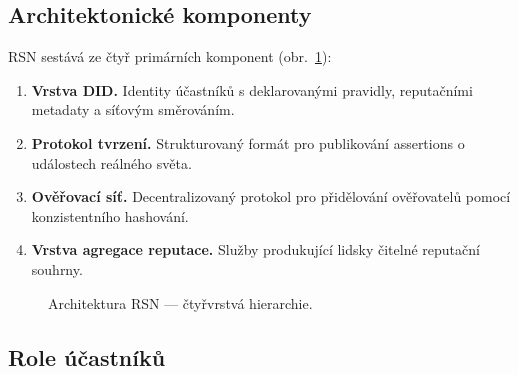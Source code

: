\documentclass[11pt,a4paper,twocolumn]{article}
\begin{document}
\subsection{Architektonické komponenty}

RSN sestává ze čtyř primárních komponent (obr.~\ref{fig:architecture}):
\begin{enumerate}[nosep]
\item \textbf{Vrstva DID.} Identity účastníků s deklarovanými pravidly, reputačními metadaty a síťovým směrováním.
\item \textbf{Protokol tvrzení.} Strukturovaný formát pro publikování assertions o událostech reálného světa.
\item \textbf{Ověřovací síť.} Decentralizovaný protokol pro přidělování ověřovatelů pomocí konzistentního hashování.
\item \textbf{Vrstva agregace reputace.} Služby produkující lidsky čitelné reputační souhrny.
\end{enumerate}

\begin{figure}[ht]
\centering
{}
\caption{Architektura RSN --- čtyřvrstvá hierarchie.}
\label{fig:architecture}
\end{figure}

\subsection{Role účastníků}
\end{document}
